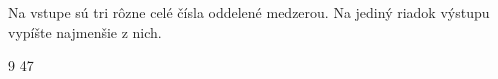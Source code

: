 




Na vstupe sú tri rôzne celé čísla oddelené medzerou. Na jediný riadok výstupu vypíšte najmenšie z
nich.

 9 47
\koniec



